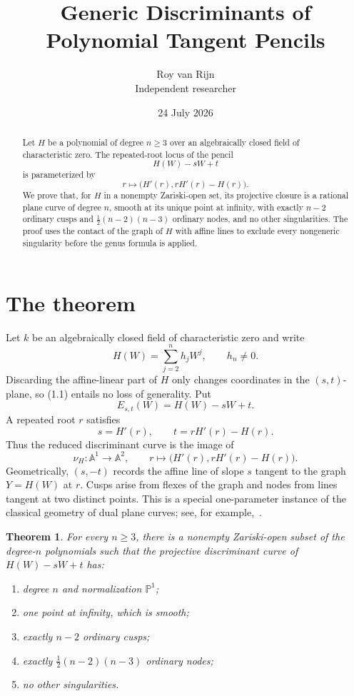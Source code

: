 \documentclass[11pt]{article}
\title{Generic Discriminants of Polynomial Tangent Pencils}
\author{Roy van Rijn\\{\small Independent researcher}}
\date{24 July 2026}
\newtheorem{theorem}{Theorem}[section]
\newcommand{\A}{\mathbb A}
\newcommand{\Pone}{\mathbb P^1}
\begin{document}
\maketitle

\begin{abstract}
Let \(H\) be a polynomial of degree \(n\geq3\) over an algebraically
closed field of characteristic zero.  The repeated-root locus of the pencil
\[
  H(W)-sW+t
\]
is parameterized by
\[
  r\longmapsto\bigl(H'(r),rH'(r)-H(r)\bigr).
\]
We prove that, for \(H\) in a nonempty Zariski-open set, its projective
closure is a rational plane curve of degree \(n\), smooth at its unique
point at infinity, with exactly \(n-2\) ordinary cusps and
\(\frac12(n-2)(n-3)\) ordinary nodes, and no other singularities.
The proof uses the contact of the graph of \(H\) with affine lines to
exclude every nongeneric singularity before the genus formula is applied.
\end{abstract}

\section{The theorem}

Let \(k\) be an algebraically closed field of characteristic zero and write
\[
  H(W)=\sum_{j=2}^{n}h_jW^j,\qquad h_n\neq0.              \tag{1.1}
\]
Discarding the affine-linear part of \(H\) only changes coordinates in the
\((s,t)\)-plane, so (1.1) entails no loss of generality.  Put
\[
  E_{s,t}(W)=H(W)-sW+t.
\]
A repeated root \(r\) satisfies
\[
  s=H'(r),\qquad t=rH'(r)-H(r).                           \tag{1.2}
\]
Thus the reduced discriminant curve is the image of
\[
  \nu_H:\A^1\longrightarrow\A^2,\qquad
  r\longmapsto\bigl(H'(r),rH'(r)-H(r)\bigr).              \tag{1.3}
\]
Geometrically, \((s,-t)\) records the affine line of slope \(s\) tangent to
the graph \(Y=H(W)\) at \(r\).  Cusps arise from flexes of the graph and
nodes from lines tangent at two distinct points.  This is a special
one-parameter instance of the classical geometry of dual plane
curves; see, for example,~\cite{Yuran}.

\begin{theorem}\label{thm:main}
For every \(n\geq3\), there is a nonempty Zariski-open subset of the
degree-\(n\) polynomials such that the projective discriminant curve of
\(H(W)-sW+t\) has:
\begin{enumerate}
\item degree \(n\) and normalization \(\Pone\);
\item one point at infinity, which is smooth;
\item exactly \(n-2\) ordinary cusps;
\item exactly \(\frac12(n-2)(n-3)\) ordinary nodes;
\item no other singularities.
\end{enumerate}
\end{theorem}
\end{document}
